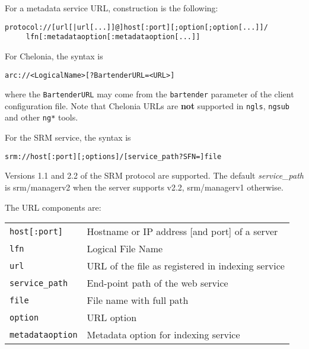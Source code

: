 For a metadata service URL, construction is the following:
\begin{shaded}
   \verb#protocol://[url[|url[...]]@]host[:port][;option[;option[...]]/#\\
   \verb#     lfn[:metadataoption[:metadataoption[...]]#
\end{shaded}

For %
Chelonia, the syntax is
\begin{shaded}
    \verb#arc://<LogicalName>[?BartenderURL=<URL>]#
\end{shaded}
where the \verb#BartenderURL# may come from the \verb#bartender# parameter of
the client configuration file. Note that Chelonia URLs are \textbf{not}
supported in \verb#ngls#, \verb#ngsub# and other \verb#ng*# tools.

For the SRM service, the syntax is
\begin{shaded}
   \verb#srm://host[:port][;options]/[service_path?SFN=]file#
\end{shaded}

Versions 1.1 and 2.2 of the SRM protocol are supported. The
default \emph{service\_path} is srm/managerv2 when the server supports
v2.2, srm/managerv1 otherwise.

The URL components are:

\begin{tabular}{lp{10cm}}
   \verb#host[:port]#&Hostname or IP address [and port] of a server\\
   \verb#lfn#&Logical File Name\\
   \verb#url#&URL of the file as registered in indexing service\\
   \verb#service_path#&End-point path of the web service\\
   \verb#file#&File name with full path\\
   \verb#option# & URL option\\
   \verb#metadataoption# & Metadata option for indexing service\\
\end{tabular}

